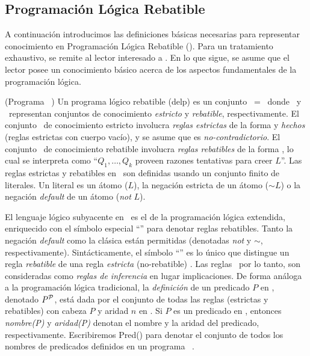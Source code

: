 \subsection{Programación Lógica Rebatible}


A continuación introducimos las definiciones básicas necesarias para representar conocimiento
en Programación Lógica Rebatible (\DLP). Para un tratamiento exhaustivo, se remite al lector
interesado a %
. En lo que sigue, se asume que el lector posee un conocimiento básico acerca de los aspectos
fundamentales de la programación lógica.

\begin{definicion}(Programa \DLP\ \PP)
	Un programa lógico rebatible (delp) es un conjunto \PP\ = \SD\ donde \SSet\ y \DD\ representan conjuntos
	de conocimiento \textit{estricto} y \textit{rebatible}, respectivamente. El conjunto \SSet\ de 
	conocimiento estricto involucra \textit{reglas estrictas} de la forma  y 					\textit{hechos} (reglas estrictas con cuerpo vacío), y se asume que es \textit{no-contradictorio}. 
	El conjunto \DD\ de conocimiento rebatible involucra \textit{reglas rebatibles} de la forma 
	, lo cual se interpreta como ``$Q_1,\ldots,Q_k$ proveen razones tentativas 
	para creer $L$''. Las reglas estrictas y rebatibles en \DLP\ son definidas usando un conjunto 
	finito de literales. Un literal es un átomo ($L$), la negación estricta de un átomo ($\sim L$) o 
	la negación \textit{default} de un átomo (\textit{not} $L$).
\end{definicion}

El lenguaje lógico subyacente en \DLP\ es el de la programación lógica extendida, %
enriquecido con el símbolo especial ``\drule{}{}'' para denotar reglas rebatibles. Tanto la negación 
\textit{default} como la clásica están permitidas (denotadas \textit{not} y \textit{$\sim$}, respectivamente).
Sintácticamente, el símbolo ``\drule{}{}'' es lo único que distingue un regla \textit{rebatible} 
 de una regla \textit{estricta} (no-rebatible) . 
Las reglas \DLP\, por lo tanto, son consideradas como \textit{reglas de inferencia} en lugar implicaciones.
De forma análoga a la programación lógica tradicional, la \textit{definición} de un predicado $P$ en \PP ,
denotado $P^{\scriptsize{\mbox{${\mathcal P}$}}}$, está dada por el conjunto de todas las reglas (estrictas y rebatibles) con cabeza $P$ 
y aridad $n$ en \PP . Si $P$ es un predicado en \PP , entonces \textit{nombre(P)} y \textit{aridad(P)} denotan
el nombre y la aridad del predicado, respectivamente. Escribiremos \textsf{Pred}(\PP) para denotar el conjunto
de todos los nombres de predicados definidos en un programa \DLP\ \PP.

